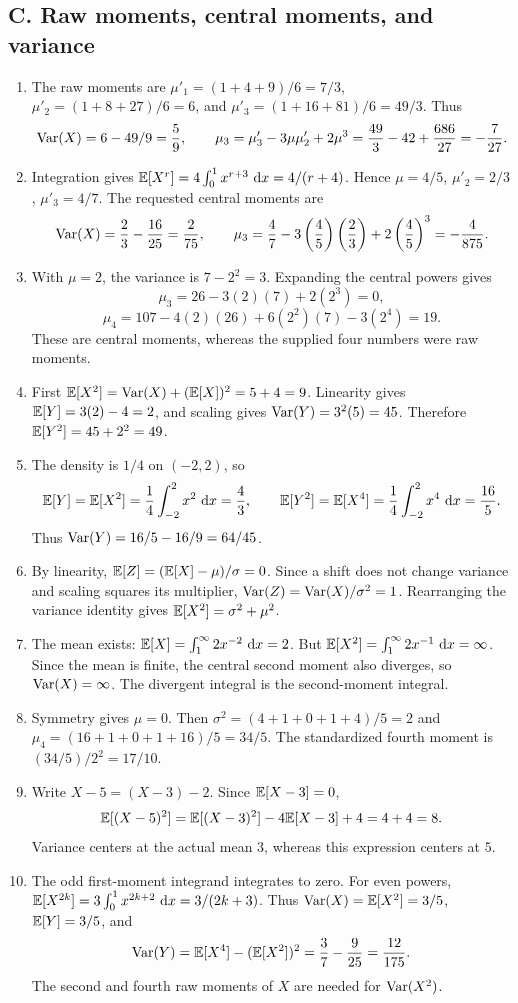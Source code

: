 \subsection{C. Raw moments, central moments, and variance}
\begin{enumerate}[label=\textbf{C\arabic*.},leftmargin=*,itemsep=1em]
\item The raw moments are $\mu'_1=(1+4+9)/6=7/3$, $\mu'_2=(1+8+27)/6=6$, and $\mu'_3=(1+16+81)/6=49/3$. Thus
\[
\operatorname{Var}(X)=6-49/9=\frac59,\qquad
\mu_3=\mu'_3-3\mu\mu'_2+2\mu^3
=\frac{49}{3}-42+\frac{686}{27}=-\frac7{27}.
\]
\item Integration gives $\mathbb E[X^r]=4\int_0^1x^{r+3}\,\,\mathrm d x=4/(r+4)$. Hence $\mu=4/5$, $\mu'_2=2/3$, $\mu'_3=4/7$. The requested central moments are
\[
\operatorname{Var}(X)=\frac23-\frac{16}{25}=\frac2{75},\qquad
\mu_3=\frac47-3\left(\frac45\right)\left(\frac23\right)+2\left(\frac45\right)^3=-\frac4{875}.
\]
\item With $\mu=2$, the variance is $7-2^2=3$. Expanding the central powers gives
\[
\mu_3=26-3(2)(7)+2(2^3)=0,
\]
\[
\mu_4=107-4(2)(26)+6(2^2)(7)-3(2^4)=19.
\]
These are central moments, whereas the supplied four numbers were raw moments.
\item First $\mathbb E[X^2]=\operatorname{Var}(X)+(\mathbb E[X])^2=5+4=9$. Linearity gives $\mathbb E[Y]=3(2)-4=2$, and scaling gives $\operatorname{Var}(Y)=3^2(5)=45$. Therefore $\mathbb E[Y^2]=45+2^2=49$.
\item The density is $1/4$ on $(-2,2)$, so
\[
\mathbb E[Y]=\mathbb E[X^2]=\frac14\int_{-2}^2x^2\,\,\mathrm d x=\frac43,\qquad
\mathbb E[Y^2]=\mathbb E[X^4]=\frac14\int_{-2}^2x^4\,\,\mathrm d x=\frac{16}{5}.
\]
Thus $\operatorname{Var}(Y)=16/5-16/9=64/45$.
\item By linearity, $\mathbb E[Z]=(\mathbb E[X]-\mu)/\sigma=0$. Since a shift does not change variance and scaling squares its multiplier, $\operatorname{Var}(Z)=\operatorname{Var}(X)/\sigma^2=1$. Rearranging the variance identity gives $\mathbb E[X^2]=\sigma^2+\mu^2$.
\item The mean exists: $\mathbb E[X]=\int_1^\infty2x^{-2}\,\,\mathrm d x=2$. But $\mathbb E[X^2]=\int_1^\infty2x^{-1}\,\,\mathrm d x=\infty$. Since the mean is finite, the central second moment also diverges, so $\operatorname{Var}(X)=\infty$. The divergent integral is the second-moment integral.
\item Symmetry gives $\mu=0$. Then $\sigma^2=(4+1+0+1+4)/5=2$ and $\mu_4=(16+1+0+1+16)/5=34/5$. The standardized fourth moment is $(34/5)/2^2=17/10$.
\item Write $X-5=(X-3)-2$. Since $\mathbb E[X-3]=0$,
\[
\mathbb E[(X-5)^2]=\mathbb E[(X-3)^2]-4\mathbb E[X-3]+4=4+4=8.
\]
Variance centers at the actual mean $3$, whereas this expression centers at $5$.
\item The odd first-moment integrand integrates to zero. For even powers, $\mathbb E[X^{2k}]=3\int_0^1x^{2k+2}\,\,\mathrm d x=3/(2k+3)$. Thus $\operatorname{Var}(X)=\mathbb E[X^2]=3/5$, $\mathbb E[Y]=3/5$, and
\[
\operatorname{Var}(Y)=\mathbb E[X^4]-(\mathbb E[X^2])^2=\frac37-\frac9{25}=\frac{12}{175}.
\]
The second and fourth raw moments of $X$ are needed for $\operatorname{Var}(X^2)$.
\end{enumerate}

